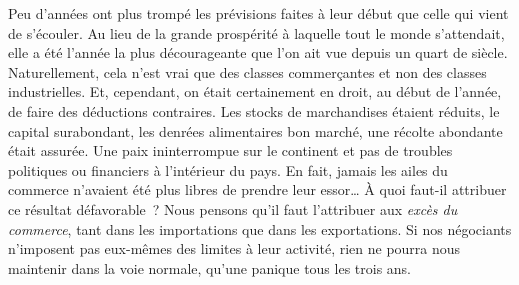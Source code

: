 \documentclass[french,twoside]{book} %
\newenvironment{quoteblock}%
  {\begin{quoting}}
  {\end{quoting}}
\newenvironment{quotebar}{%
    \def\FrameCommand{{\color{rubric!10!}\vrule width 0.5em} \hspace{0.9em}}%
    \def\OuterFrameSep{\itemsep} %
    \MakeFramed {\advance\hsize-\width \FrameRestore}
  }%
  {%
    \endMakeFramed
  }
\renewenvironment{quoteblock}%
  {%
    \savenotes
    \setstretch{0.9}
    \normalfont
    \begin{quotebar}
  }
  {%
    \end{quotebar}
    \spewnotes
  }
\begin{document}
\begin{quoteblock}
 \noindent Peu d’années ont plus trompé les prévisions faites à leur début que celle qui vient de s’écouler. Au lieu de la grande prospérité à laquelle tout le monde s’attendait, elle a été l’année la plus décourageante que l’on ait vue depuis un quart de siècle. Naturellement, cela n’est vrai que des classes commerçantes et non des classes industrielles. Et, cependant, on était certainement en droit, au début de l’année, de faire des déductions contraires. Les stocks de marchandises étaient réduits, le capital surabondant, les denrées alimentaires bon marché, une récolte abondante était assurée. Une paix ininterrompue sur le continent et pas de troubles politiques ou financiers à l’intérieur du pays. En fait, jamais les ailes du commerce n’avaient été plus libres de prendre leur essor… À quoi faut-il attribuer ce résultat défavorable ? Nous pensons qu’il faut l’attribuer aux \emph{excès du commerce}, tant dans les importations que dans les exportations. Si nos négociants n’imposent pas eux-mêmes des limites à leur activité, rien ne pourra nous maintenir dans la voie normale, qu’une panique tous les trois ans.
\end{quoteblock}
\end{document}
